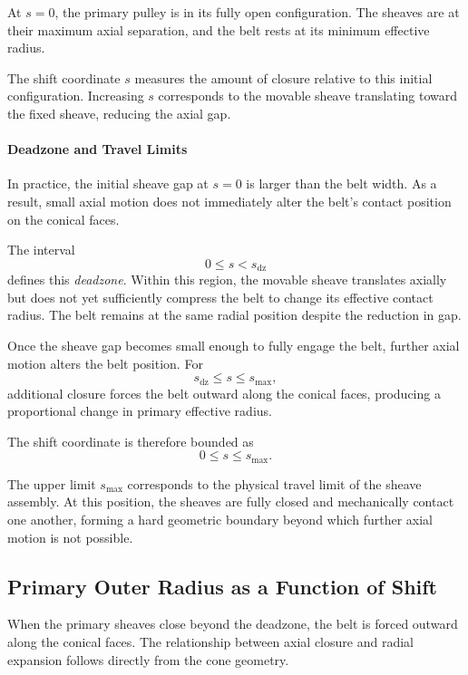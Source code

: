 \documentclass[11pt]{article}
\numberwithin{equation}{section}
\begin{document}
At $s = 0$, the primary pulley is in its fully open configuration.
The sheaves are at their maximum axial separation, and the belt
rests at its minimum effective radius.

The shift coordinate $s$ measures the amount of closure relative
to this initial configuration. Increasing $s$ corresponds to the
movable sheave translating toward the fixed sheave, reducing the
axial gap.

\paragraph{Deadzone and Travel Limits}

In practice, the initial sheave gap at $s = 0$ is larger than the
belt width. As a result, small axial motion does not immediately
alter the belt’s contact position on the conical faces.

The interval
\[
0 \le s < s_{\mathrm{dz}}
\]
defines this \emph{deadzone}. Within this region, the movable
sheave translates axially but does not yet sufficiently compress
the belt to change its effective contact radius. The belt remains
at the same radial position despite the reduction in gap.

Once the sheave gap becomes small enough to fully engage the belt,
further axial motion alters the belt position. For
\[
s_{\mathrm{dz}} \le s \le s_{\max},
\]
additional closure forces the belt outward along the conical faces,
producing a proportional change in primary effective radius.

The shift coordinate is therefore bounded as
\[
0 \le s \le s_{\max}.
\]

The upper limit $s_{\max}$ corresponds to the physical travel limit
of the sheave assembly. At this position, the sheaves are fully closed
and mechanically contact one another, forming a hard geometric boundary
beyond which further axial motion is not possible.


\subsection{Primary Outer Radius as a Function of Shift}
\label{sec:rp}

When the primary sheaves close beyond the deadzone, the belt is forced
outward along the conical faces. The relationship between axial closure
and radial expansion follows directly from the cone geometry.
\end{document}
